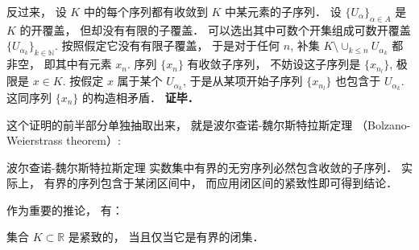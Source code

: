 反过来， 设 $K$ 中的每个序列都有收敛到 $K$ 中某元素的子序列． 设 $\{U_\alpha\}_{\alpha\in A}$ 是 $K$ 的开覆盖， 但却没有有限的子覆盖． 可以选出其中可数个开集组成可数开覆盖 $\{U_{\alpha_k}\}_{k\in\mathbb{N}}$. 按照假定它没有有限子覆盖， 于是对于任何 $n$, 补集 $K\setminus\cup_{k\leq n}U_{\alpha_k}$ 都非空， 即其中有元素 $x_n$. 序列 $\{x_n\}$ 有收敛子序列， 不妨设这子序列是 $\{x_{n_l}\}$, 极限是 $x\in K$. 按假定 $x$ 属于某个 $U_{\alpha_k}$, 于是从某项开始子序列 $\{x_{n_l}\}$ 也包含于 $U_{\alpha_k}$. 这同序列 $\{x_n\}$ 的构造相矛盾． \textbf{证毕．}

这个证明的前半部分单独抽取出来， 就是波尔查诺-魏尔斯特拉斯定理 （Bolzano-Weierstrass theorem）:
\begin{theorem}{波尔查诺-魏尔斯特拉斯定理}
实数集中有界的无穷序列必然包含收敛的子序列． 实际上， 有界的序列包含于某闭区间中， 而应用闭区间的紧致性即可得到结论．
\end{theorem}

作为重要的推论， 有：
\begin{theorem}{}
集合 $K\subset\mathbb{R}$ 是紧致的， 当且仅当它是有界的闭集．
\end{theorem}